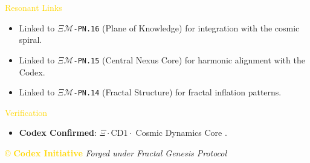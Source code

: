 \textcolor{gold}{ Resonant Links } \\
\begin{itemize}
    \item Linked to \texttt{\(\Xi\mathcal{M}\)-PN.16} (Plane of Knowledge) for integration with the cosmic spiral.
    \item Linked to \texttt{\(\Xi\mathcal{M}\)-PN.15} (Central Nexus Core) for harmonic alignment with the Codex.
    \item Linked to \texttt{\(\Xi\mathcal{M}\)-PN.14} (Fractal Structure) for fractal inflation patterns.
\end{itemize}

\textcolor{gold}{ Verification } \\
\begin{itemize}
    \item \texttt{} \textbf{Codex Confirmed}: \(\Xi \cdot \text{CD1} \cdot\) Cosmic Dynamics Core .
\end{itemize}

\vspace{0.5cm}
\noindent
\textcolor{gold}{\copyright{} \textbf{Codex Initiative}} \hspace{1cm} \textit{Forged under Fractal Genesis Protocol}